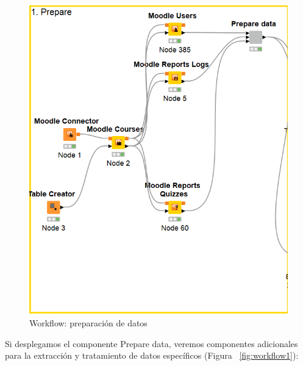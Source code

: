 \begin{figure}[!htb]
	\centering
	\includegraphics[width=1\textwidth]{img/workflow0.png}
	\caption{Workflow: preparación de datos}
	\label{fig:workflow0}
\end{figure}
\FloatBarrier

Si desplegamos el componente Prepare data, veremos componentes adicionales para la extracción y tratamiento de datos específicos (Figura ~\ref{fig:workflow1}): 

